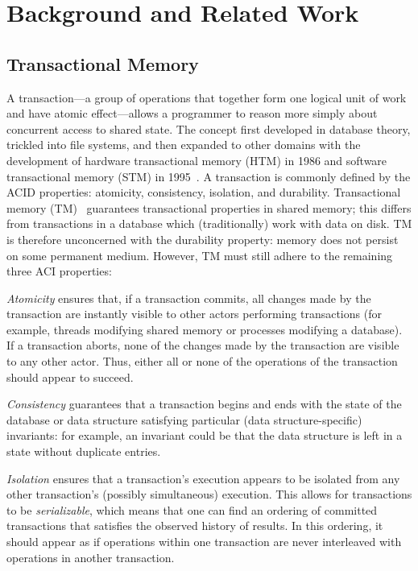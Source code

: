 \chapter{Background and Related Work}
\label{related_work}

\section{Transactional Memory}
A transaction---a group of operations that together form one logical unit of work and have atomic effect---allows a programmer to reason more simply about concurrent access to shared state. The concept first developed in database theory, trickled into file systems, and then expanded to other domains with the development of hardware transactional memory (HTM) in 1986 and software transactional memory (STM) in 1995~\cite{harristm}. 
A transaction is commonly defined by the ACID properties: atomicity, consistency, isolation, and durability. Transactional memory (TM)~\cite{harristm, herlihytm} guarantees transactional properties in shared memory; this differs from transactions in a database which (traditionally) work with data on disk.
TM is therefore unconcerned with the durability property: memory does not persist on some permanent medium. However, TM must still adhere to the remaining three ACI properties:

\emph{Atomicity} ensures that, if a transaction commits, all changes made by the transaction are instantly visible to other actors performing transactions (for example, threads modifying shared memory or processes modifying a database). If a transaction aborts, none of the changes made by the transaction are visible to any other actor. Thus, either all or none of the operations of the transaction should appear to succeed.

\emph{Consistency} guarantees that a transaction begins and ends with the state of the database or data structure satisfying particular (data structure-specific) invariants: for example, an invariant could be that the data structure is left in a state without duplicate entries.

\emph{Isolation} ensures that a transaction's execution appears to be isolated from any other transaction's (possibly simultaneous) execution. This allows for transactions to be \emph{serializable}, which means that one can find an ordering of committed transactions that satisfies the observed history of results. In this ordering, it should appear as if operations within one transaction are never interleaved with operations in another transaction. 

